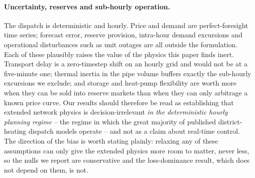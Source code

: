 
\paragraph{Uncertainty, reserves and sub-hourly operation.}
The dispatch is deterministic and hourly. Price and demand are perfect-foresight time
series; forecast error, reserve provision, intra-hour demand excursions and operational
disturbances such as unit outages are all outside the formulation. Each of these plausibly
raises the value of the physics this paper finds inert. Transport delay is a zero-timestep
shift on an hourly grid and would not be at a five-minute one; thermal inertia in the pipe
volume buffers exactly the sub-hourly excursions we exclude; and storage and heat-pump
flexibility are worth more when they can be sold into reserve markets than when they can
only arbitrage a known price curve. Our results should therefore be read as establishing
that extended network physics is decision-irrelevant \emph{in the deterministic hourly
planning regime} -- the regime in which the great majority of published district-heating
dispatch models operate -- and not as a claim about real-time control. The direction of
the bias is worth stating plainly: relaxing any of these assumptions can only give the
extended physics more room to matter, never less, so the nulls we report are conservative
and the loss-dominance result, which does not depend on them, is not.


